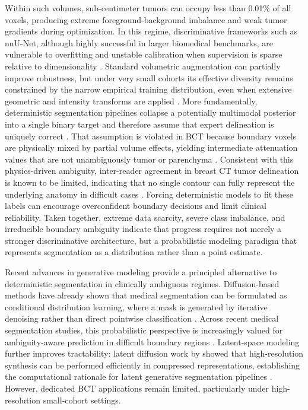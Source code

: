 \documentclass{iopjournal}
\begin{document}
Within such volumes, sub-centimeter tumors can occupy less than 0.01\% of all voxels, producing extreme foreground-background imbalance and weak tumor gradients during optimization. In this regime, discriminative frameworks such as nnU-Net, although highly successful in larger biomedical benchmarks, are vulnerable to overfitting and unstable calibration when supervision is sparse relative to dimensionality \cite{isensee2021nnu}. Standard volumetric augmentation can partially improve robustness, but under very small cohorts its effective diversity remains constrained by the narrow empirical training distribution, even when extensive geometric and intensity transforms are applied \cite{isensee2021nnu, perez-garcia2021torchio}. More fundamentally, deterministic segmentation pipelines collapse a potentially multimodal posterior into a single binary target and therefore assume that expert delineation is uniquely correct \cite{schmidt2023probabilistic}. That assumption is violated in BCT because boundary voxels are physically mixed by partial volume effects, yielding intermediate attenuation values that are not unambiguously tumor or parenchyma \cite{lyu2021computer, weber2024potential}. Consistent with this physics-driven ambiguity, inter-reader agreement in breast CT tumor delineation is known to be limited, indicating that no single contour can fully represent the underlying anatomy in difficult cases \cite{caballo2020mass, shim2022fully}. Forcing deterministic models to fit these labels can encourage overconfident boundary decisions and limit clinical reliability. Taken together, extreme data scarcity, severe class imbalance, and irreducible boundary ambiguity indicate that progress requires not merely a stronger discriminative architecture, but a probabilistic modeling paradigm that represents segmentation as a distribution rather than a point estimate.

Recent advances in generative modeling provide a principled alternative to deterministic segmentation in clinically ambiguous regimes. Diffusion-based methods have already shown that medical segmentation can be formulated as conditional distribution learning, where a mask is generated by iterative denoising rather than direct pointwise classification \cite{wu2024medsegdiff, rahman2023ambiguous, wolleb2022diffusion, chen2025diffunet}. Across recent medical segmentation studies, this probabilistic perspective is increasingly valued for ambiguity-aware prediction in difficult boundary regions \cite{wu2024medsegdiff, rahman2023ambiguous, schmidt2023probabilistic, chen2025diffunet}. Latent-space modeling further improves tractability: latent diffusion work by \cite{rombach2022high} showed that high-resolution synthesis can be performed efficiently in compressed representations, establishing the computational rationale for latent generative segmentation pipelines \cite{rombach2022high}. However, dedicated BCT applications remain limited, particularly under high-resolution small-cohort settings.
\end{document}
